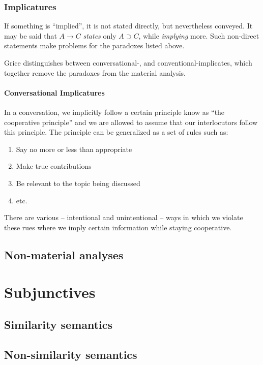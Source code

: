 \documentclass[12pt]{report}
\begin{document}
\section{Implicatures}

If something is ``implied'', it is not stated directly, but nevertheless
conveyed. It may be said that $A \rightarrow C$ \emph{states} only $A \supset
C$, while \emph{implying} more. Such non-direct statements make problems for the
paradoxes listed above.

Grice distinguishes between conversational-, and conventional-implicates, which
together remove the paradoxes from the material analysis.

\subsection{Conversational Implicatures}

In a conversation, we implicitly follow a certain principle know as ``the
cooperative principle'' and we are allowed to assume that our interlocutors
follow this principle. The principle can be generalized as a set of rules such
as:
\begin{enumerate}
	\item
		Say no more or less than appropriate
	\item
		Make true contributions
	\item
		Be relevant to the topic being discussed
	\item
		etc.
\end{enumerate}

There are various -- intentional and unintentional -- ways in which we violate
these rues where we imply certain information while staying cooperative.

\chapter{Non-material analyses}

\part{Subjunctives}
\chapter{Similarity semantics}

\chapter{Non-similarity semantics}
\end{document}

